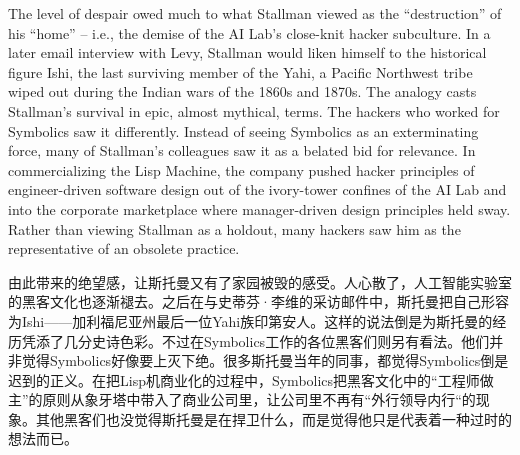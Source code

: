 \ifdefined\eng
The level of despair owed much to what Stallman viewed as the ``destruction'' of his ``home'' -- i.e., the demise of the AI Lab's close-knit hacker subculture. In a later email interview with Levy, Stallman would liken himself to the historical figure Ishi, the last surviving member of the Yahi, a Pacific Northwest tribe wiped out during the Indian wars of the 1860s and 1870s. The analogy casts Stallman's survival in epic, almost mythical, terms. The hackers
who worked for Symbolics saw it differently. Instead of seeing Symbolics as an exterminating force, many of Stallman's colleagues saw it as a belated bid for relevance. In commercializing the Lisp Machine, the company pushed hacker principles of engineer-driven software design out of the ivory-tower confines of the AI Lab and into the corporate marketplace where manager-driven design principles held sway. Rather than viewing Stallman as a holdout, many hackers saw him as the representative of an obsolete practice.
\fi

\ifdefined\chs
由此带来的绝望感，让斯托曼又有了家园被毁的感受。人心散了，人工智能实验室的黑客文化也逐渐褪去。之后在与史蒂芬·李维的采访邮件中，斯托曼把自己形容为Ishi——加利福尼亚州最后一位Yahi族印第安人。这样的说法倒是为斯托曼的经历凭添了几分史诗色彩。不过在Symbolics工作的各位黑客们则另有看法。他们并非觉得Symbolics好像要上灭下绝。很多斯托曼当年的同事，都觉得Symbolics倒是迟到的正义。在把Lisp机商业化的过程中，Symbolics把黑客文化中的``工程师做主''的原则从象牙塔中带入了商业公司里，让公司里不再有``外行领导内行``的现象。其他黑客们也没觉得斯托曼是在捍卫什么，而是觉得他只是代表着一种过时的想法而已。
\fi


